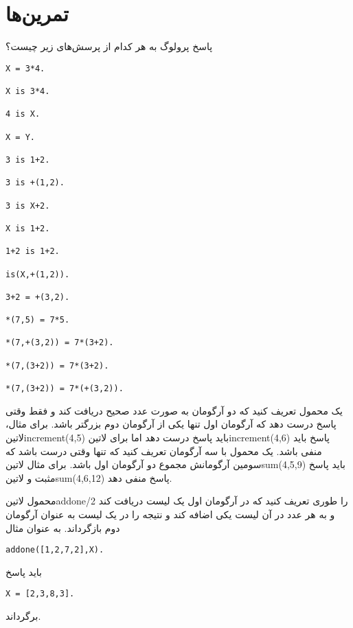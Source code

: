 \clearpage

\section{تمرین‌ها}
\begin{exercise}
پاسخ پرولوگ به هر کدام از پرسش‌های زیر چیست؟

\begin{latin}
\begin{lstlisting}
X = 3*4.

X is 3*4.

4 is X.

X = Y.

3 is 1+2.

3 is +(1,2).

3 is X+2.

X is 1+2.

1+2 is 1+2.

is(X,+(1,2)).

3+2 = +(3,2).

*(7,5) = 7*5.

*(7,+(3,2)) = 7*(3+2).

*(7,(3+2)) = 7*(3+2).

*(7,(3+2)) = 7*(+(3,2)).
\end{lstlisting}
\end{latin}
\end{exercise}

\begin{exercise}
\begin{enumerate}
 یک محمول تعریف کنید که دو آرگومان به صورت عدد صحیح دریافت کند و فقط وقتی پاسخ درست دهد که آرگومان اول تنها یکی از آرگومان دوم بزرگتر باشد. برای مثال، ‌لاتین{increment(4,5)} باید پاسخ درست دهد اما برای ‌لاتین{increment(4,6)} پاسخ باید منفی باشد.
 یک محمول با سه آرگومان تعریف کنید که تنها وقتی درست باشد که سومین آرگومانش مجموع دو آرگومان اول باشد. برای مثال ‌لاتین{sum(4,5,9)} باید پاسخ مثبت و ‌لاتین{sum(4,6,12)} پاسخ منفی دهد.
\end{enumerate}
\end{exercise}

\begin{exercise}
محمول ‌لاتین{addone/2} را طوری تعریف کنید که در آرگومان اول یک لیست دریافت کند و به هر عدد در آن لیست یکی اضافه کند و نتیجه را در یک لیست به عنوان آرگومان دوم بازگرداند. به عنوان مثال
\begin{latin}
\begin{lstlisting}
addone([1,2,7,2],X).
\end{lstlisting}
\end{latin}
باید پاسخ
\begin{latin}
\begin{lstlisting}
X = [2,3,8,3].
\end{lstlisting}
\end{latin}
برگرداند.
\end{exercise}

